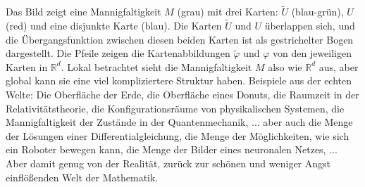 Das Bild zeigt eine Mannigfaltigkeit $M$ (grau) mit drei Karten: $\tilde{U}$ (blau-grün), $U$ (red) und eine disjunkte Karte (blau). Die Karten $\tilde{U}$ und $U$ überlappen sich, und die Übergangsfunktion zwischen diesen beiden Karten ist als gestrichelter Bogen dargestellt. Die Pfeile zeigen die Kartenabbildungen $\tilde{\varphi}$
und $\varphi$ von den jeweiligen Karten in $\mathbb{R}^d$.  Lokal betrachtet sieht die Mannigfaltigkeit $M$
also wie $\mathbb{R}^d$ aus, aber global kann sie eine viel kompliziertere Struktur haben. 
Beispiele aus der echten Welte: Die Oberfläche der Erde, die Oberfläche eines Donuts, die Raumzeit 
in der Relativitätstheorie, die Konfigurationsräume von physikalischen Systemen, die Mannigfaltigkeit 
der Zustände in der Quantenmechanik, ... aber  auch die Menge der Lösungen einer Differentialgleichung, 
die Menge der Möglichkeiten, wie sich ein Roboter bewegen kann, die Menge der Bilder eines neuronalen
Netzes, ...
Aber damit genug von der Realität, zurück zur schönen und weniger Angst einflößenden Welt der Mathematik.

